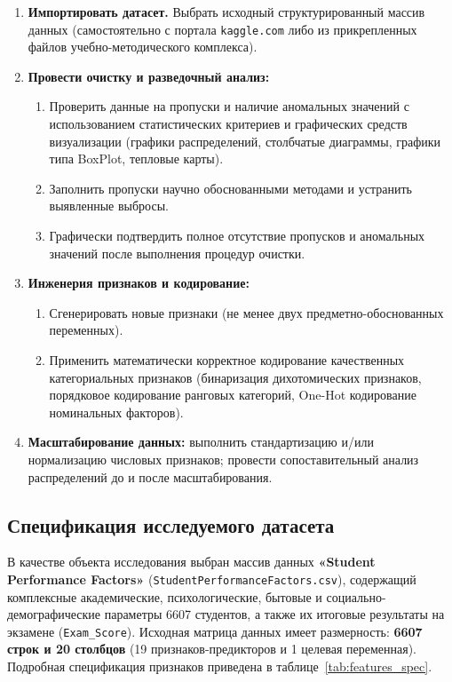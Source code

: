 \documentclass[14pt,a4paper]{extarticle}
\begin{document}
\begin{enumerate}
    \item \textbf{Импортировать датасет.} Выбрать исходный структурированный массив данных (самостоятельно с портала \texttt{kaggle.com} либо из прикрепленных файлов учебно-методического комплекса).
    \item \textbf{Провести очистку и разведочный анализ:}
    \begin{enumerate}
        \item Проверить данные на пропуски и наличие аномальных значений с использованием статистических критериев и графических средств визуализации (графики распределений, столбчатые диаграммы, графики типа BoxPlot, тепловые карты).
        \item Заполнить пропуски научно обоснованными методами и устранить выявленные выбросы.
        \item Графически подтвердить полное отсутствие пропусков и аномальных значений после выполнения процедур очистки.
    \end{enumerate}
    \item \textbf{Инженерия признаков и кодирование:}
    \begin{enumerate}
        \item Сгенерировать новые признаки (не менее двух предметно-обоснованных переменных).
        \item Применить математически корректное кодирование качественных категориальных признаков (бинаризация дихотомических признаков, порядковое кодирование ранговых категорий, One-Hot кодирование номинальных факторов).
    \end{enumerate}
    \item \textbf{Масштабирование данных:} выполнить стандартизацию и/или нормализацию числовых признаков; провести сопоставительный анализ распределений до и после масштабирования.
\end{enumerate}

\subsection{Спецификация исследуемого датасета}

В качестве объекта исследования выбран массив данных \textbf{«Student Performance Factors»} (\texttt{StudentPerformanceFactors.csv}), содержащий комплексные академические, психологические, бытовые и социально-демографические параметры 6607 студентов, а также их итоговые результаты на экзамене (\texttt{Exam\_Score}). Исходная матрица данных имеет размерность: \textbf{6607 строк и 20 столбцов} (19 признаков-предикторов и 1 целевая переменная). Подробная спецификация признаков приведена в таблице~\ref{tab:features_spec}.
\end{document}

